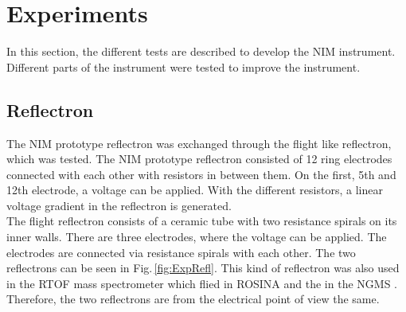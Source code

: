 \section{Experiments}

%

	In this section, the different tests are described to develop the NIM instrument. Different parts of the instrument were tested to improve the instrument.
	\subsection{Reflectron}
	
	The NIM prototype reflectron was exchanged through the flight like reflectron, which was tested. The NIM prototype reflectron consisted of 12 ring electrodes connected with each other with resistors in between them. On the first, 5th and 12th electrode, a voltage can be applied. With the different resistors, a linear voltage gradient in the reflectron is generated.\\ %
	The flight reflectron consists of a ceramic tube with two resistance spirals on its inner walls. There are three electrodes, where the voltage can be applied. The electrodes are connected via resistance spirals with each other. The two reflectrons can be seen in Fig.\,\ref{fig:ExpRefl}. This kind of reflectron was also used in the RTOF mass spectrometer which flied in ROSINA \cite{Diss_Scherer} and the in the NGMS \cite{Diss_Hofer}. \\ %
	Therefore, the two reflectrons are from the electrical point of view the same.\\ %
	
